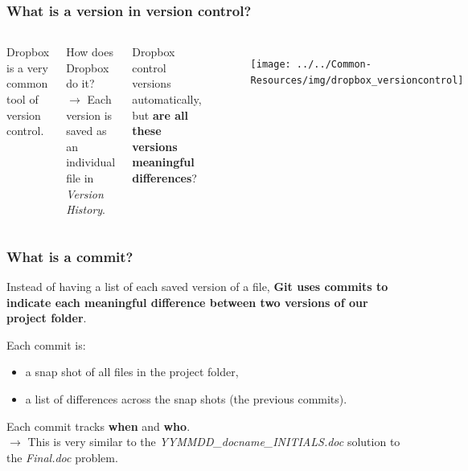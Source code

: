 \documentclass[aspectratio=169]{beamer} %
\begin{document}
\begin{frame}
\frametitle{What is a version in version control?}

	\begin{columns}[c]

		Dropbox is a very common tool of version control.
		
		\vspace{.5cm}
		
		How does Dropbox do it? \\
		$\rightarrow$ Each version is saved as an individual file in \textit{Version History}.
		
		\vspace{.5cm}
		
		Dropbox control versions automatically, but \textbf{are all these versions meaningful differences}?

		\begin{figure}
			\centering
			\texttt{[image: ../../Common-Resources/img/dropbox\_versioncontrol]}
			\label{fig:dropboxversioncontrol}
		\end{figure}

	\end{columns}


\end{frame}

\begin{frame}
\frametitle{What is a commit?}

	Instead of having a list of each saved version of a file, \textbf{Git uses commits to indicate each meaningful difference between two versions of our project folder}.

	\vspace{.25cm}

	Each commit is: 
	\begin{itemize}
		\item a snap shot of all files in the project folder,
		\item a list of differences across the snap shots (the previous commits).
	\end{itemize}

	\vspace{.25cm}

	Each commit tracks \textbf{when} and \textbf{who}. \\
	{\small $\rightarrow$ This is very similar to the \textit{YYMMDD\_docname\_INITIALS.doc} solution to the \textit{Final.doc} problem.} 

\end{frame}
\end{document}
